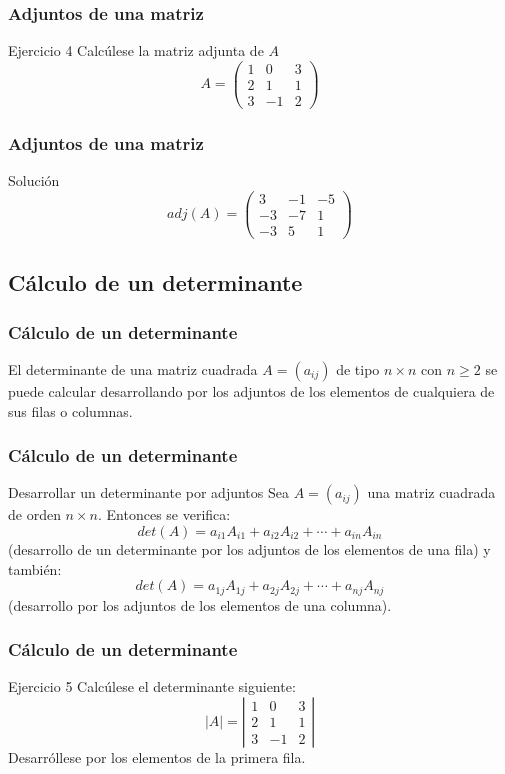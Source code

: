\documentclass[12pt]{article}
\begin{document}
   
    \begin{frame}
  \frametitle{Adjuntos de una matriz}
   \begin{block}{Ejercicio 4}
Calc\'ulese la matriz adjunta de $A$
\[A = \left(\begin{array}{ccc}1 & 0 & 3 \\2 & 1 & 1 \\3 & -1 & 2\end{array}\right)\]
   \end{block}
   \end{frame}
   
       \begin{frame}
  \frametitle{Adjuntos de una matriz}
Soluci\'on
\[adj(A) = \left(\begin{array}{ccc}3 & -1 & -5 \\-3 & -7 & 1 \\-3 & 5 & 1\end{array}\right)\]
   \end{frame}  
  
      \subsection{C\'alculo de un determinante}

       \begin{frame}
  \frametitle{C\'alculo de un determinante}
El determinante de una matriz cuadrada $A = (a_{ij} )$ de tipo $n \times n$ con $n \geq 2$ se puede calcular desarrollando por los adjuntos de los elementos de cualquiera de sus filas o columnas.
   \end{frame}  
  

    \begin{frame}
  \frametitle{C\'alculo de un determinante}
   \begin{block}{Desarrollar un determinante por adjuntos}
Sea  $A = (a_{ij} )$ una matriz cuadrada de orden $n \times n$. Entonces se verifica:
\[det(A) = a_{i1}A_{i1} + a_{i2}A_{i2} + \cdots + a_{in}A_{in}\]
(desarrollo de un determinante por los adjuntos de los elementos de una fila) y tambi\'en:
\[det(A)=a_{1j}A_{1j} +a_{2j}A_{2j} +\cdots+a_{nj}A_{nj}\]
(desarrollo por los adjuntos de los elementos de una columna).
   \end{block}
   \end{frame}

\begin{frame}
  \frametitle{C\'alculo de un determinante}
     \begin{block}{Ejercicio 5}
Calc\'ulese el determinante siguiente:
\[|A| = \left|\begin{array}{ccc}1 & 0 & 3 \\2 & 1 & 1 \\3 & -1 & 2\end{array}\right|\]
Desarr\'ollese por los elementos de la primera fila.
\end{block}
\end{frame} 
\end{document}
